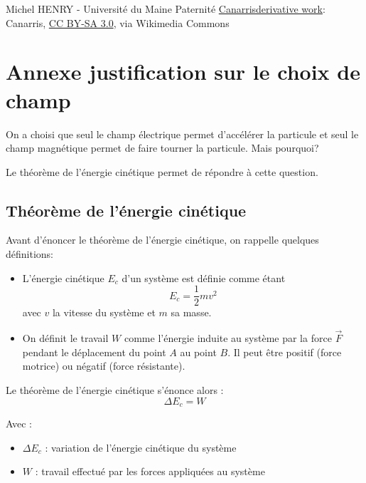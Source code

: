 \documentclass[14pt]{article}
\begin{document}
\begin{thebibliography}{9}
Michel HENRY - Université du Maine Paternité
\href{https://commons.wikimedia.org/wiki/File:Rechte-Hand-Regel.svg}{Canarrisderivative work}: Canarris, \href{https://creativecommons.org/licenses/by-sa/3.0}{CC BY-SA 3.0}, via Wikimedia Commons
\end{thebibliography}

\section{Annexe justification sur le choix de champ}

On a choisi que seul le champ électrique permet d'accélérer la particule et seul le champ magnétique permet de faire tourner la particule. Mais pourquoi?

Le théorème de l'énergie cinétique permet de répondre à cette question.

\subsection{Théorème de l'énergie cinétique}\label{theoEC}

Avant d'énoncer le théorème de l'énergie cinétique, on rappelle quelques définitions:
\begin{itemize}
    \item L'énergie cinétique $E_c$ d'un système est définie comme étant
    \begin{equation} \label{eq:3.1.1}
        E_c = \frac{1}{2} m v^2
        \tag{3.1.1}
    \end{equation}
    avec $v$ la vitesse du système et $m$ sa masse.
    \item On définit le travail $W$ comme l'énergie induite au système par la force $\vec{F}$ pendant le déplacement du point $A$ au point $B$.
    Il peut être positif (force motrice) ou négatif (force résistante).
\end{itemize}

\hspace{1mm}

Le théorème de l'énergie cinétique s'énonce alors :
\begin{equation} \label{eq:3.1.2}
    \Delta E_c = W
    \tag{3.1.2}
\end{equation}

Avec :
\begin{itemize}
    \item $\Delta E_c$ : variation de l'énergie cinétique du système
    \item $W$ : travail effectué par les forces appliquées au système
\end{itemize}
\end{document}
